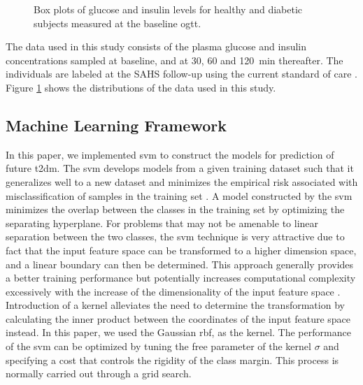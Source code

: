 \documentclass[journal,comsoc]{IEEEtran}
\renewcommand{\^}{\hat}  %
\begin{document}
%
\begin{figure}[t!]
	\centering
	\caption{Box plots of glucose and insulin levels for healthy and diabetic subjects measured at the baseline \ac{ogtt}.}
  \label{fig:ogtt_mean}
\end{figure}
The data used in this study consists of the plasma glucose and insulin concentrations sampled at baseline, and at \num{30}, \num{60} and \SI{120}{\minute} thereafter. The individuals are labeled at the SAHS follow-up using the current standard of care \cite{burke_rapid_1999}. Figure \ref{fig:ogtt_mean} shows the distributions of the data used in this study.
%
%
\subsection{Machine Learning Framework}
%
In this paper, we implemented \ac{svm} to construct the models for prediction of future \ac{t2dm}. The \ac{svm} develops models from a given training dataset such that it generalizes well to a new dataset and minimizes the empirical risk associated with misclassification of samples in the training set \cite{vapnik_nature_2000,vapnik2015uniform}. A model constructed by the \ac{svm} minimizes the overlap between the classes in the training set by optimizing the separating hyperplane. For problems that may not be amenable to linear separation between the two classes, the \ac{svm} technique is very attractive due to fact that the input feature space can be transformed to a higher dimension space,  and a linear boundary can then be determined. This approach generally provides a better training performance but potentially increases computational complexity excessively with the increase of the dimensionality of the input feature space \cite{friedman2001elements}. Introduction of a kernel alleviates the need to determine the transformation by calculating the inner product between the coordinates of the input feature space instead. In this paper, we used the Gaussian \ac{rbf},  as the kernel. The performance of the \ac{svm} can be optimized by tuning the free parameter of the kernel $\sigma$ and specifying a cost that controls the rigidity of the class margin. This process is normally carried out through a grid search.
%
%
%
%
\end{document}
